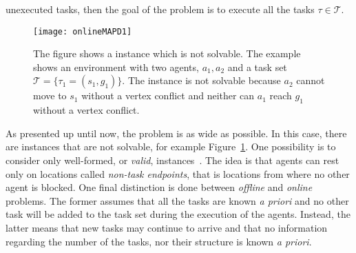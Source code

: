 unexecuted tasks, then the goal of the problem is to execute all the tasks 
$\tau\in\mathcal{T}$.
\begin{figure}[tpb]
  \centering
  \texttt{[image: onlineMAPD1]}
  \caption{The figure shows a  instance which is not solvable. The
  example shows an environment with two agents, $a_1, a_2$ and a task set
  $\mathcal{T}=\{\tau_1=(s_1,g_1)\}$. The instance is not solvable because 
  $a_2$ cannot move to $s_1$ without a vertex conflict and neither can $a_1$ 
  reach $g_1$ without a vertex conflict. }
  \label{fig:onlineMAPD1}
\end{figure}
\newline
As presented up until now, the problem is as wide as possible. In this case,
there are instances that are not solvable, for example
Figure~\ref{fig:onlineMAPD1}. One possibility is to consider only well-formed,
or \textit{valid},  instances~\cite{wellFormedMAPD}. The idea is 
that agents can rest only on locations called \textit{non-task endpoints}, that 
is locations from where no other agent is blocked. \newline
One final distinction is done between \textit{offline} and \textit{online}
 problems. The former assumes that all the tasks are known \textit{a 
priori} and no other task will be added to the task set during the execution of
the agents. Instead, the latter means that new tasks may continue to arrive and
that no information regarding the number of the tasks, nor their structure is
known \textit{a priori}. 
%
